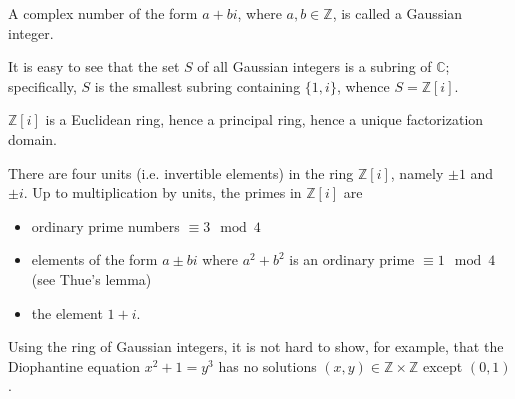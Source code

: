 \documentclass[12pt]{article}
\begin{document}
\newcommand{\Z}{\mathbb{Z}}
\newcommand{\G}{\mathbb{Z}[i]}
A complex number of the form $a+bi$, where $a,b\in\mathbb{Z}$, is called
a Gaussian integer.

It is easy to see that the set $S$ of all Gaussian integers is a subring
of $\mathbb{C}$; specifically, $S$ is the smallest subring containing
$\{1,i\}$, whence $S=\G$.

$\G$ is a Euclidean ring, hence a principal ring, hence a
unique factorization domain.

There are four units (i.e. invertible elements)
in the ring $\G$, namely $\pm 1$ and $\pm i$.
Up to multiplication by units, the primes in $\G$ are
\begin{itemize}
\item ordinary prime numbers $\equiv 3\mod 4$
\item elements of the form $a\pm bi$ where $a^2+b^2$ is an ordinary
prime $\equiv 1\mod 4$ (see Thue's lemma)
\item the element $1+i$.
\end{itemize}

Using the ring of Gaussian integers, it is not hard to show, for example,
that the Diophantine equation $x^2+1=y^3$ has no solutions $(x,y)\in\Z\times\Z$
except $(0,1)$.
\end{document}
